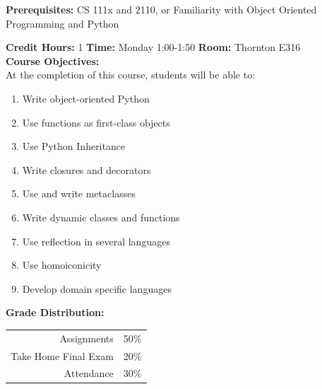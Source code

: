\documentclass[11pt]{article}
\begin{document}
\textbf {Prerequisites:}  
CS 111x and 2110, 
or Familiarity with Object Oriented Programming and Python

\textbf {Credit Hours:} 1 \hspace{5mm} \textbf{Time:} Monday 1:00-1:50 \hspace{5mm} \textbf{Room:} Thornton E316\\

\textbf {\large Course Objectives:} \\
At the completion of this course, students will be able to:
\begin{enumerate} \itemsep-0.4em
  \item Write object-oriented Python
  \item Use functions as first-class objects
  \item Use Python Inheritance  
  \item Write closures and decorators
  \item Use and write metaclasses  
  \item Write dynamic classes and functions 
  \item Use reflection in several languages
  \item Use homoiconicity
  \item Develop domain specific languages
\end{enumerate}

\textbf {\large Grade Distribution:} \\
\hspace*{40mm}
\begin{tabular}{ r l }
Assignments & 50\% \\
Take Home Final Exam  & 20\% \\
Attendance  & 30\%
\end{tabular} \\\\

\newpage
\end{document}
